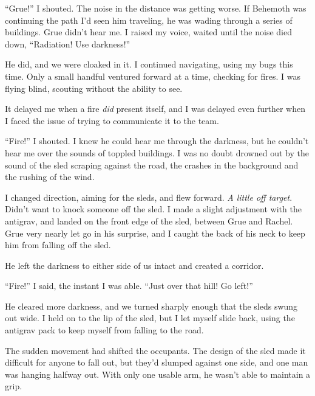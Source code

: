 ``Grue!''  I shouted.  The noise in the distance was getting worse.  If Behemoth was continuing the path I'd seen him traveling, he was wading through a series of buildings.  Grue didn't hear me.  I raised my voice, waited until the noise died down, ``Radiation!  Use darkness!''



He did, and we were cloaked in it.  I continued navigating, using my bugs this time.  Only a small handful ventured forward at a time, checking for fires.  I was flying blind, scouting without the ability to see.



It delayed me when a fire \emph{did} present itself, and I was delayed even further when I faced the issue of trying to communicate it to the team.



``Fire!'' I shouted.  I knew he could hear me through the darkness, but he couldn't hear me over the sounds of toppled buildings.  I was no doubt drowned out by the sound of the sled scraping against the road, the crashes in the background and the rushing of the wind.



I changed direction, aiming for the sleds, and flew forward.  \emph{A little off target}.  Didn't want to knock someone off the sled.  I made a slight adjustment with the antigrav, and landed on the front edge of the sled, between Grue and Rachel.  Grue very nearly let go in his surprise, and I caught the back of his neck to keep him from falling off the sled.



He left the darkness to either side of us intact and created a corridor.



``Fire!'' I said, the instant I was able.  ``Just over that hill!  Go left!''



He cleared more darkness, and we turned sharply enough that the sleds swung out wide.  I held on to the lip of the sled, but I let myself slide back, using the antigrav pack to keep myself from falling to the road.



The sudden movement had shifted the occupants.  The design of the sled made it difficult for anyone to fall out, but they'd slumped against one side, and one man was hanging halfway out.  With only one usable arm, he wasn't able to maintain a grip.



